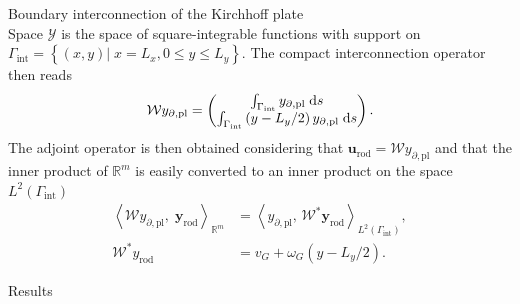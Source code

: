 \documentclass[aspectratio=169]{ISAE-Beamer}
\begin{document}
\begin{frame}{Boundary interconnection of the Kirchhoff plate}
\begin{equation*}
\end{equation*}
Space $\mathscr{Y}$ is the space of square-integrable functions with support on $\Gamma_{\text{int}} = \left\{ (x,y) \vert \; x=L_x, 0 \le y \le L_y  \right\}$.
 The compact interconnection operator then reads
\begin{equation*}
\mathcal{W} y_{\partial, \text{pl}} = \begin{pmatrix}
\int_{\Gamma_{\text{int}}} y_{\partial, \text{pl}} \d{s} \\
\int_{\Gamma_{\text{int}}} \left( y - L_y/2 \right) y_{\partial, \text{pl}} \d{s} \\
\end{pmatrix}.
\end{equation*}
The adjoint operator is then obtained considering that $\bm{u}_{\text{rod}} = \mathcal{W} y_{\partial, \text{pl}}$ and that the inner product of $\mathbb{R}^m$ is easily converted to an inner product on the space $L^2(\Gamma_{\text{int}})$
\begin{align*}
\left\langle \mathcal{W} y_{\partial, \text{pl}}, \; \bm{y}_{\text{rod}} \right\rangle_{\mathbb{R}^m} &= \left\langle y_{\partial, \text{pl}}, \, \mathcal{W}^* \bm{y}_{\text{rod}}\right\rangle_{L^2(\Gamma_{\text{int}})}, \\
\mathcal{W}^* {y}_{\text{rod}} &= v_G + \omega_{G} \left( y - L_y/2 \right).
\end{align*}
\end{frame}

\begin{frame}{Results}
\begin{center}
	\end{center}
\end{frame}
\end{document}
